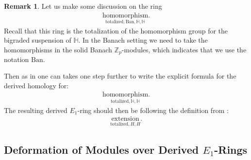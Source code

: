 \documentclass[12pt]{article}
\theoremstyle{definition}
\newtheorem{remark}{Remark}
\begin{document}
\begin{remark}
\indent Let us make some discussion on the ring
\begin{align}
\underset{{\mathrm{totalized},\mathrm{Ban},\mathbb{H},\mathbb{H}}}{\mathrm{homomorphism}}.
\end{align}
Recall that this ring is the totalization of the homomorphism group for the bigraded suspension of $\mathbb{H}$. In the Banach setting we need to take the homomorphisms in the solid Banach $\mathbb{Z}_p$-modules, which indicates that we use the notation $\mathrm{Ban}$.
\end{remark}

\indent Then as in \cite[Theorem 1.1]{So1} one can takes one step further to write the explicit formula for the derived homology for:
\begin{align}
\underset{{\mathrm{totalized},\mathbb{H},\mathbb{H}}}{\mathrm{homomorphism}}.
\end{align}
The resulting derived $E_1$-ring should then be following the definition from \cite{Sa}:
\begin{align}
\underset{{\mathrm{totalized},H,H}}{\mathrm{extension}}.
\end{align}



\subsection{Deformation of Modules over Derived $E_1$-Rings}
\end{document}
